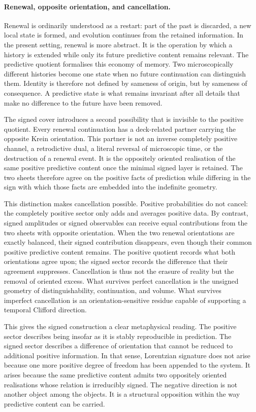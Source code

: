 \documentclass[11pt]{article}
\theoremstyle{definition}
\theoremstyle{remark}
\begin{document}
\paragraph{Renewal, opposite orientation, and cancellation.}
Renewal is ordinarily understood as a restart: part of the past is discarded,
a new local state is formed, and evolution continues from the retained
information.  In the present setting, renewal is more abstract.  It is the
operation by which a history is extended while only its future predictive
content remains relevant.  The predictive quotient formalises this economy of
memory.  Two microscopically different histories become one state when no
future continuation can distinguish them.  Identity is therefore not defined
by sameness of origin, but by sameness of consequence.  A predictive state is
what remains invariant after all details that make no difference to the
future have been removed.

The signed cover introduces a second possibility that is invisible to the
positive quotient.  Every renewal continuation has a deck-related partner
carrying the opposite Krein orientation.  This partner is not an inverse
completely positive channel, a retrodictive dual, a literal reversal of
microscopic time, or the destruction of a renewal event.  It is the
oppositely oriented realisation of the same positive predictive content once
the minimal signed layer is retained.  The two sheets therefore agree on the
positive facts of prediction while differing in the sign with which those
facts are embedded into the indefinite geometry.

This distinction makes cancellation possible.  Positive probabilities do not
cancel: the completely positive sector only adds and averages positive data.
By contrast, signed amplitudes or signed observables can receive equal
contributions from the two sheets with opposite orientation.  When the two
renewal orientations are exactly balanced, their signed contribution
disappears,
even though their common positive predictive content remains.  The positive
quotient records what both orientations agree upon; the signed sector records
the difference that their agreement suppresses.  Cancellation is thus not
the erasure of reality but the removal of oriented excess.  What survives
perfect cancellation is the unsigned geometry of distinguishability,
continuation, and volume.  What survives imperfect cancellation is an
orientation-sensitive residue capable of supporting a temporal Clifford
direction.

This gives the signed construction a clear metaphysical reading.  The positive
sector describes being insofar as it is stably reproducible in prediction.
The signed sector describes a difference of orientation that cannot be reduced
to additional positive information.  In that sense, Lorentzian signature does
not arise because one more positive degree of freedom has been appended to
the system.  It arises because the same predictive content admits two
oppositely oriented realisations whose relation is irreducibly signed.  The
negative direction is not another object among the objects.  It is a
structural opposition within the way predictive content can be carried.
\end{document}
